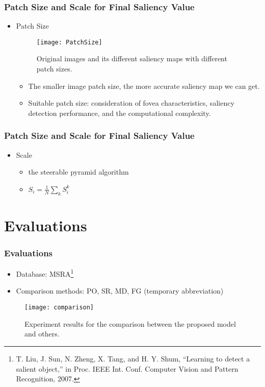 \documentclass[notheorems,serif,table,compress]{beamer}  %
\begin{document}
\begin{frame}
\frametitle{Patch Size and Scale for Final Saliency Value}
\begin{itemize} 
\item Patch Size
\begin{figure}
 \texttt{[image: PatchSize]}
 \caption{Original images and its different saliency maps with different patch sizes.}
\end{figure}
\begin{itemize}
\item The smaller image patch size, the more accurate saliency map we can get.
\item Suitable patch size: consideration of {\color{blue}fovea characteristics}, {\color{blue}saliency detection performance}, and {\color{blue}the computational complexity}.
\end{itemize}

\end{itemize}

\end{frame}

\begin{frame}
\frametitle{Patch Size and Scale for Final Saliency Value}
\begin{itemize} 
\item Scale
\begin{itemize}
\item the steerable pyramid algorithm
\item $S_{i}=\frac{1}{N} \sum_{k}S_{i}^{k}$
\end{itemize}
\end{itemize}

\end{frame}

\section{Evaluations}

\begin{frame}
\frametitle{Evaluations}
\begin{itemize}
\item Database: MSRA\footnote{T. Liu, J. Sun, N. Zheng, X. Tang, and H. Y. Shum, “Learning to detect a salient object,” in Proc. IEEE Int. Conf. Computer Vision and Pattern Recognition, 2007.} 
\item Comparison methods: PO, SR, MD, FG (temporary abbreviation)
\end{itemize}
\begin{figure}
 \texttt{[image: comparison]}
 \caption{Experiment results for the comparison between the proposed model and others.}
\end{figure}

\end{frame}
\end{document}
